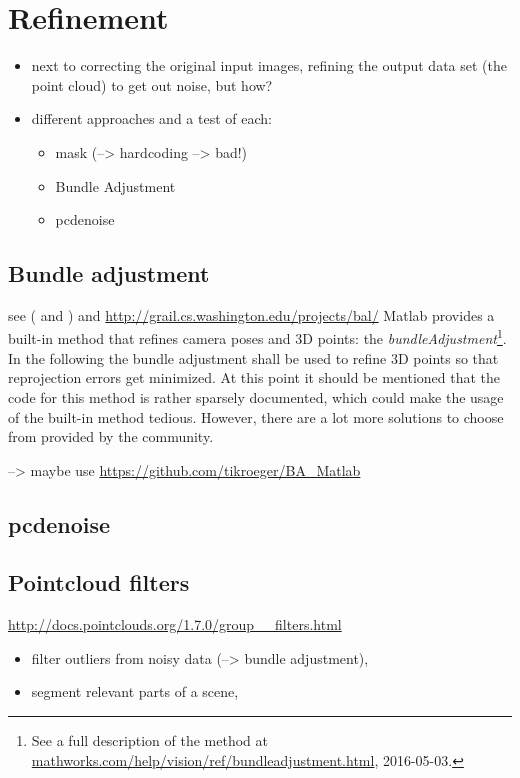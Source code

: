\section{Refinement}\label{sec:refinement}

\begin{itemize}
\item next to correcting the original input images, refining the output data set (the point cloud) to get out noise, but how?
\item different approaches and a test of each:
  \begin{itemize}
   \item mask (--> hardcoding --> bad!)
   \item Bundle Adjustment
   \item pcdenoise
   \end{itemize}
\end{itemize}

\subsection{Bundle adjustment}
see (\cite[p.320]{Szeliski.2011} and \cite[p.322]{Luhmann.2014})
and \url{http://grail.cs.washington.edu/projects/bal/}
Matlab provides a built-in method that refines camera poses and 3D points: the \textit{bundleAdjustment}\footnote{See a full description of the method at \url{mathworks.com/help/vision/ref/bundleadjustment.html}, 2016-05-03.}. In the following the bundle adjustment  shall be used to refine 3D points so that reprojection errors get minimized. At this point it should be mentioned that the code for this method is rather sparsely documented, which could make the usage of the built-in method tedious. However, there are a lot more solutions to choose from provided by the community.

--> maybe use \url{https://github.com/tikroeger/BA_Matlab}




\subsection{pcdenoise}

\subsection{Pointcloud filters}
\url{http://docs.pointclouds.org/1.7.0/group__filters.html}
\begin{itemize}
\item filter outliers from noisy data (--> bundle adjustment), 
\item segment relevant parts of a scene, 
\end{itemize}

